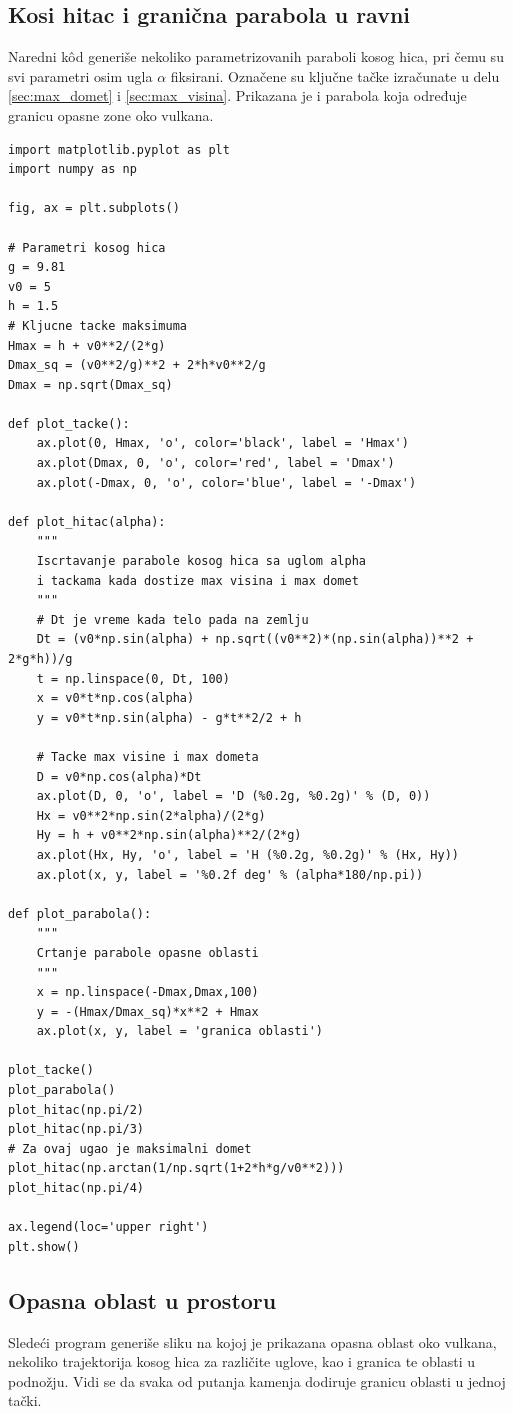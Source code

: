 \documentclass[a4paper]{article}
\begin{document}
\subsection{Kosi hitac i granična parabola u ravni}
\label{kod:2D_oblast}
Naredni k\^od generiše nekoliko parametrizovanih paraboli kosog hica, pri čemu
su svi parametri osim ugla $\alpha$ fiksirani. Označene su ključne tačke
izračunate u delu \ref{sec:max_domet} i \ref{sec:max_visina}. Prikazana je i
parabola koja određuje granicu opasne zone oko vulkana.
\begin{verbatim}
import matplotlib.pyplot as plt
import numpy as np

fig, ax = plt.subplots()

# Parametri kosog hica
g = 9.81
v0 = 5
h = 1.5
# Kljucne tacke maksimuma
Hmax = h + v0**2/(2*g)
Dmax_sq = (v0**2/g)**2 + 2*h*v0**2/g
Dmax = np.sqrt(Dmax_sq)

def plot_tacke():
    ax.plot(0, Hmax, 'o', color='black', label = 'Hmax')
    ax.plot(Dmax, 0, 'o', color='red', label = 'Dmax')
    ax.plot(-Dmax, 0, 'o', color='blue', label = '-Dmax')

def plot_hitac(alpha):
    """
    Iscrtavanje parabole kosog hica sa uglom alpha
    i tackama kada dostize max visina i max domet
    """
    # Dt je vreme kada telo pada na zemlju
    Dt = (v0*np.sin(alpha) + np.sqrt((v0**2)*(np.sin(alpha))**2 + 2*g*h))/g
    t = np.linspace(0, Dt, 100)
    x = v0*t*np.cos(alpha)
    y = v0*t*np.sin(alpha) - g*t**2/2 + h
    
    # Tacke max visine i max dometa
    D = v0*np.cos(alpha)*Dt
    ax.plot(D, 0, 'o', label = 'D (%0.2g, %0.2g)' % (D, 0))
    Hx = v0**2*np.sin(2*alpha)/(2*g)
    Hy = h + v0**2*np.sin(alpha)**2/(2*g)
    ax.plot(Hx, Hy, 'o', label = 'H (%0.2g, %0.2g)' % (Hx, Hy))
    ax.plot(x, y, label = '%0.2f deg' % (alpha*180/np.pi))

def plot_parabola():
    """
    Crtanje parabole opasne oblasti
    """
    x = np.linspace(-Dmax,Dmax,100)
    y = -(Hmax/Dmax_sq)*x**2 + Hmax
    ax.plot(x, y, label = 'granica oblasti')

plot_tacke()
plot_parabola()
plot_hitac(np.pi/2)
plot_hitac(np.pi/3)
# Za ovaj ugao je maksimalni domet
plot_hitac(np.arctan(1/np.sqrt(1+2*h*g/v0**2)))
plot_hitac(np.pi/4)

ax.legend(loc='upper right')
plt.show()
\end{verbatim}

\subsection{Opasna oblast u prostoru}
\label{kod:oblast}
Sledeći program generiše sliku na kojoj je prikazana opasna oblast oko vulkana,
nekoliko trajektorija kosog hica za različite uglove, kao i granica te oblasti u 
podnožju. Vidi se da svaka od putanja kamenja dodiruje granicu oblasti u jednoj tački.
\end{document}
